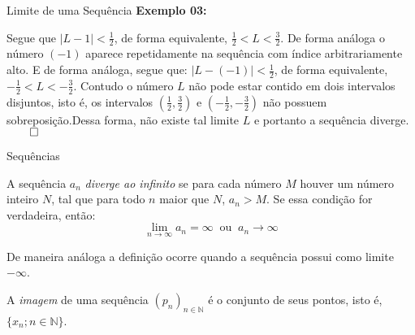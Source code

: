 \documentclass[hyperref={pdfpagelabels=false}]{beamer}
\begin{document}
\begin{frame}{Limite de uma Sequência}
{\bf Exemplo 03:} 
 
 Segue que $| L - 1| < \displaystyle \frac{1}{2}$, de forma equivalente,  $\displaystyle \frac{1}{2} < L < \displaystyle \frac{3}{2}$. De forma análoga o número $(-1)$ aparece repetidamente na sequência com índice arbitrariamente alto. E de forma análoga, segue que: $| L - (-1)| < \displaystyle \frac{1}{2}$, de forma equivalente,  $\displaystyle -\frac{1}{2} < L < \displaystyle -\frac{3}{2}$. \pause Contudo o número $L$ não pode estar contido em dois intervalos disjuntos, isto é, os intervalos $\left( \displaystyle \frac{1}{2}, \displaystyle \frac{3}{2} \right)$ e $\left( \displaystyle -\frac{1}{2}, \displaystyle -\frac{3}{2} \right)$ não possuem sobreposição.\pause Dessa forma, não existe tal limite $L$ e portanto a sequência diverge. $\qed$
 
\end{frame}

\begin{frame}{Sequências}
 \begin{definition}
  A sequência $a_n$ \emph{diverge ao infinito} se para cada número $M$ houver um número inteiro $N$, tal que para todo $n$ maior que $N$, $a_n > M$. Se essa condição for verdadeira, então: 
  \begin{equation*}
   \lim_{n \to \infty} a_n = \infty ~\text{ ou } ~ a_n \to \infty
  \end{equation*} \pause
  
  De maneira análoga a definição ocorre quando a sequência possui como limite $-\infty$.
 \end{definition}\pause
 
 \begin{definition}
  A \emph{imagem} de uma sequência $(p_n)_{n \in \mathbb{N}}$ é o conjunto de seus pontos, isto é, $\{ x_n ; n \in \mathbb{N}\}$. 
 \end{definition} \pause
 
\end{frame}
\end{document}
